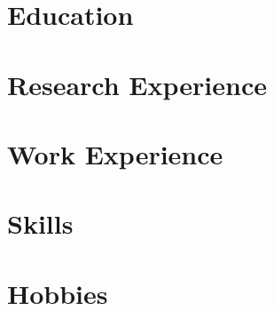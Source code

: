 \documentclass[letterpaper,11pt]{article}
\begin{document}



\section{Education}
  \vspace{3pt}
  

\section{Research Experience}
  \vspace{3pt}
  

\section{Work Experience}
  \vspace{3pt}
  

\section{Skills}
  \vspace{2pt}
  

\section{Hobbies}
    

\end{document}
